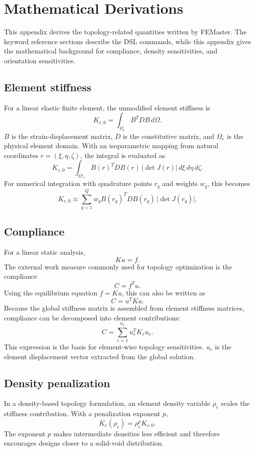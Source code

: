 \chapter{Mathematical Derivations}
\label{chap:appendix-derivations}

This appendix derives the topology-related quantities written by FEMaster. The keyword reference sections describe the DSL commands, while this appendix gives the mathematical background for compliance, density sensitivities, and orientation sensitivities.

\section{Element stiffness}

For a linear elastic finite element, the unmodified element stiffness is
\[
K_{e,0} = \int_{\Omega_e} B^T D B \, d\Omega .
\]
\(B\) is the strain-displacement matrix, \(D\) is the constitutive matrix, and \(\Omega_e\) is the physical element domain. With an isoparametric mapping from natural coordinates \(r=(\xi,\eta,\zeta)\), the integral is evaluated as
\[
K_{e,0}
=
\int_{\Omega'_e}
B(r)^T D B(r)\,
\lvert \det J(r)\rvert \, d\xi\,d\eta\,d\zeta .
\]
For numerical integration with quadrature points \(r_q\) and weights \(w_q\), this becomes
\[
K_{e,0}
\approx
\sum_{q=1}^{Q}
w_q B(r_q)^T D B(r_q)\,
\lvert \det J(r_q)\rvert .
\]

\section{Compliance}

For a linear static analysis,
\[
K u = f .
\]
The external work measure commonly used for topology optimization is the compliance
\[
C = f^T u .
\]
Using the equilibrium equation \(f=Ku\), this can also be written as
\[
C = u^T K u .
\]
Because the global stiffness matrix is assembled from element stiffness matrices, compliance can be decomposed into element contributions:
\[
C = \sum_{e=1}^{n_e} u_e^T K_e u_e .
\]
This expression is the basis for element-wise topology sensitivities. \(u_e\) is the element displacement vector extracted from the global solution.

\section{Density penalization}

In a density-based topology formulation, an element density variable \(\rho_e\) scales the stiffness contribution. With a penalization exponent \(p\),
\[
K_e(\rho_e) = \rho_e^p K_{e,0}.
\]
The exponent \(p\) makes intermediate densities less efficient and therefore encourages designs closer to a solid-void distribution.

